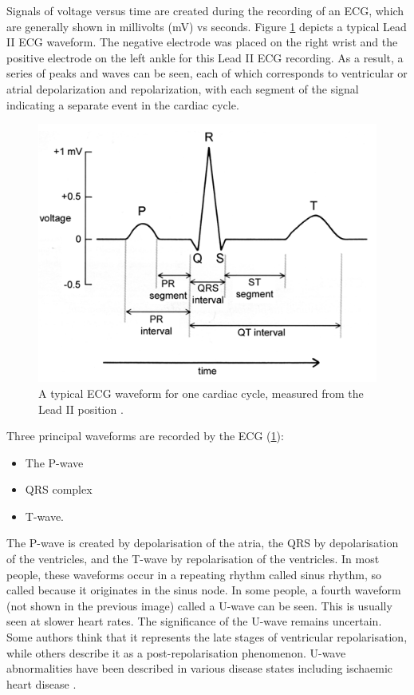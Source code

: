 Signals of voltage versus time are created during the recording of an ECG, which are generally shown in millivolts (mV) vs seconds. Figure \ref{fig:ECG_waveform} depicts a typical Lead II ECG waveform. The negative electrode was placed on the right wrist and the positive electrode on the left ankle for this Lead II ECG recording. As a result, a series of peaks and waves can be seen, each of which corresponds to ventricular or atrial depolarization and repolarization, with each segment of the signal indicating a separate event in the cardiac cycle.

\begin{figure}[H]
\centering
\includegraphics[scale=0.7]{img/ECG_waveform.PNG}
\caption{A typical ECG waveform for one cardiac cycle, measured from the Lead II position \cite{ecg1}.}
\label{fig:ECG_waveform}
\end{figure}
 
Three principal waveforms are recorded by the ECG (\ref{fig:ECG_waveform}):

\begin{itemize}
    \item The P-wave
    \item QRS complex
    \item T-wave.
\end{itemize}

The P-wave is created by depolarisation of the atria, the QRS by depolarisation of the ventricles, and the T-wave by repolarisation of the ventricles. In most people, these waveforms occur in a repeating rhythm called sinus rhythm, so called because it originates in the sinus node. In some people, a fourth waveform (not shown in the previous image) called a U-wave can be seen. This is usually seen at slower heart rates. The significance of the U-wave remains uncertain. Some authors think that it represents the late stages of ventricular repolarisation, while others describe it as a post-repolarisation phenomenon. U-wave abnormalities have been described in various disease states including ischaemic heart disease \cite{ecg2}.
 

